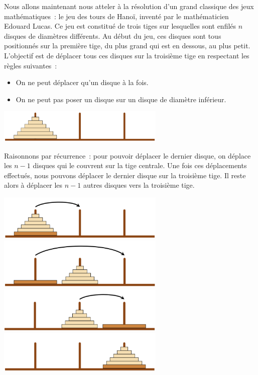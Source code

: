 \documentclass{magnoliaold}
\begin{document}
Nous allons maintenant nous atteler à la résolution d'un grand classique des jeux
mathématiques~: le jeu des tours de Hanoï, inventé par le mathématicien
Edouard Lucas. Ce jeu est constitué de trois tiges sur lesquelles sont enfilés $n$
disques de diamètres différents. Au début du jeu, ces disques sont tous positionnés
sur la première tige, du plus grand qui est en dessous, au plus petit. L'objectif
est de déplacer tous ces disques sur la troisième tige en respectant les règles
suivantes~:
\begin{itemize}
\item On ne peut déplacer qu'un disque à la fois.
\item On ne peut pas poser un disque sur un disque de diamètre inférieur.
\end{itemize}
\begin{center}
\includegraphics[width=0.6\textwidth]{../../Commun/Images/python-exos-rec-9.pdf}
\end{center}
Raisonnons par récurrence~: pour pouvoir déplacer le dernier disque, on déplace
les $n-1$ disques qui le couvrent sur la tige centrale. Une fois ces
déplacements effectués, nous pouvons déplacer le dernier disque sur la troisième
tige. Il reste alors à déplacer les $n-1$ autres disques vers la troisième tige.
\begin{center}
\includegraphics[width=0.6\textwidth]{../../Commun/Images/python-exos-rec-10.pdf}
\hspace{1cm}
\includegraphics[width=0.6\textwidth]{../../Commun/Images/python-exos-rec-11.pdf}
\hspace{1cm}
\includegraphics[width=0.6\textwidth]{../../Commun/Images/python-exos-rec-12.pdf}
\hspace{1cm}
\includegraphics[width=0.6\textwidth]{../../Commun/Images/python-exos-rec-13.pdf}
\end{center}
\end{document}
